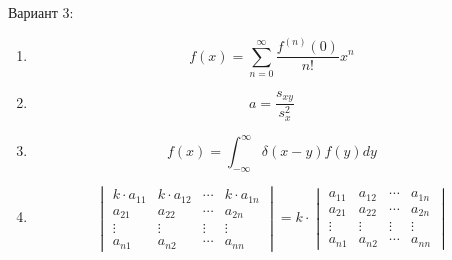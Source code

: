 \documentclass[a4paper]{article}
\begin{document}
Вариант 3:
\begin{enumerate}
    \item \[f(x) = \sum_{n = 0}^{\infty} \frac{f^{(n)}(0)}{n!}x^n\]
    \item \[a = \frac{s_{xy}}{s_x^2}\]
    \item \[f(x) = \int_{-\infty}^{\infty} \delta (x-y) f(y)dy\]
    \item \[\begin{vmatrix}
        k\cdot a_{11} & k\cdot a_{12} &\cdots& k\cdot a_{1n} \\
        a_{21} & a_{22} & \cdots & a_{2n}  \\
        \vdots & \vdots & \vdots & \vdots \\
        a_{n1} & a_{n2} & \cdots & a_{nn}
    \end{vmatrix} = k \cdot \begin{vmatrix}
        a_{11} & a_{12} &\cdots& a_{1n} \\
        a_{21} & a_{22} & \cdots & a_{2n}  \\
        \vdots & \vdots & \vdots & \vdots \\
        a_{n1} & a_{n2} & \cdots & a_{nn}
    \end{vmatrix}\]
\end{enumerate}
\end{document}
